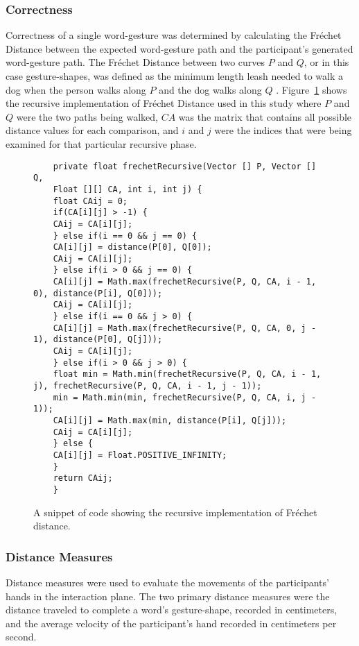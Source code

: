 \subsubsection{Correctness} \label{pilot_correctness}
Correctness of a single word-gesture was determined by calculating the Fr\'echet Distance between the expected word-gesture path and the participant's generated word-gesture path. The Fr\'echet Distance between two curves $P$ and $Q$, or in this case gesture-shapes, was defined as the minimum length leash needed to walk a dog when the person walks along $P$ and the dog walks along $Q$ \cite{ref_frechet}. Figure~\ref{code_frechet} shows the recursive implementation of Fr\'echet Distance used in this study where $P$ and $Q$ were the two paths being walked, $CA$ was the matrix that contains all possible distance values for each comparison, and $i$ and $j$ were the indices that were being examined for that particular recursive phase.

\begin{figure}[h] %
	\centering
	\begin{lstlisting}
	private float frechetRecursive(Vector [] P, Vector [] Q,
	Float [][] CA, int i, int j) {
	float CAij = 0;
	if(CA[i][j] > -1) {
	CAij = CA[i][j];
	} else if(i == 0 && j == 0) {
	CA[i][j] = distance(P[0], Q[0]);
	CAij = CA[i][j];
	} else if(i > 0 && j == 0) {
	CA[i][j] = Math.max(frechetRecursive(P, Q, CA, i - 1, 0), distance(P[i], Q[0]));
	CAij = CA[i][j];
	} else if(i == 0 && j > 0) {
	CA[i][j] = Math.max(frechetRecursive(P, Q, CA, 0, j - 1), distance(P[0], Q[j]));
	CAij = CA[i][j];
	} else if(i > 0 && j > 0) {
	float min = Math.min(frechetRecursive(P, Q, CA, i - 1, j), frechetRecursive(P, Q, CA, i - 1, j - 1));
	min = Math.min(min, frechetRecursive(P, Q, CA, i, j - 1));
	CA[i][j] = Math.max(min, distance(P[i], Q[j]));
	CAij = CA[i][j];
	} else {
	CA[i][j] = Float.POSITIVE_INFINITY;
	}
	return CAij;
	}
	\end{lstlisting}
	\caption[Fr\'echet Distance code snippet]{A snippet of code showing the recursive implementation of Fr\'echet distance.}
	\label{code_frechet}
\end{figure}  

\subsubsection{Distance Measures}
Distance measures were used to evaluate the movements of the participants' hands in the interaction plane. The two primary distance measures were the distance traveled to complete a word's gesture-shape, recorded in centimeters, and the average velocity of the participant's hand recorded in centimeters per second.

